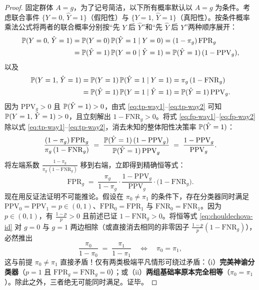 \begin{proof}
固定群体 $A = g$，为了记号简洁，以下所有概率默认以 $A = g$ 为条件。考虑联合事件 $\{Y = 0,\, \hat{Y} = 1\}$（假阳性）与 $\{Y = 1,\, \hat{Y} = 1\}$（真阳性）。按条件概率乘法公式将两者的联合概率分别按“先 $Y$ 后 $\hat{Y}$”和“先 $\hat{Y}$ 后 $Y$”两种顺序展开：
\begin{align}
  \mathbb{P}(Y = 0,\, \hat{Y} = 1)
  &= \mathbb{P}(Y = 0)\,\mathbb{P}(\hat{Y} = 1 \mid Y = 0) = (1 - \pi_g)\,\mathrm{FPR}_g \label{eq:fp-way1}\\
  &= \mathbb{P}(\hat{Y} = 1)\,\mathbb{P}(Y = 0 \mid \hat{Y} = 1) = \mathbb{P}(\hat{Y} = 1)\,(1 - \mathrm{PPV}_g), \label{eq:fp-way2}
\end{align}
以及
\begin{align}
  \mathbb{P}(Y = 1,\, \hat{Y} = 1)
  &= \mathbb{P}(Y = 1)\,\mathbb{P}(\hat{Y} = 1 \mid Y = 1) = \pi_g\,(1 - \mathrm{FNR}_g) \label{eq:tp-way1}\\
  &= \mathbb{P}(\hat{Y} = 1)\,\mathbb{P}(Y = 1 \mid \hat{Y} = 1) = \mathbb{P}(\hat{Y} = 1)\,\mathrm{PPV}_g. \label{eq:tp-way2}
\end{align}
因为 $\mathrm{PPV}_g > 0$ 且 $\mathbb{P}(\hat{Y} = 1) > 0$，由式 \eqref{eq:tp-way1}--\eqref{eq:tp-way2} 可知 $\mathbb{P}(Y = 1,\, \hat{Y} = 1) > 0$，且立刻解出 $1 - \mathrm{FNR}_g > 0$。将式 \eqref{eq:fp-way1}--\eqref{eq:fp-way2} 除以式 \eqref{eq:tp-way1}--\eqref{eq:tp-way2}，消去未知的整体阳性决策率 $\mathbb{P}(\hat{Y} = 1)$：
\[
  \frac{(1 - \pi_g)\,\mathrm{FPR}_g}{\pi_g\,(1 - \mathrm{FNR}_g)}
  \;=\; \frac{\mathbb{P}(\hat{Y} = 1)\,(1 - \mathrm{PPV}_g)}{\mathbb{P}(\hat{Y} = 1)\,\mathrm{PPV}_g}
  \;=\; \frac{1 - \mathrm{PPV}_g}{\mathrm{PPV}_g}.
\]
将左端系数 $\frac{1 - \pi_g}{\pi_g\,(1 - \mathrm{FNR}_g)}$ 移到右端，立即得到精确恒等式：
\[
  \mathrm{FPR}_g \;=\; \frac{\pi_g}{1 - \pi_g}\cdot \frac{1 - \mathrm{PPV}_g}{\mathrm{PPV}_g}\cdot \big(1 - \mathrm{FNR}_g\big).
\]
现在用反证法证明不可能推论。假设在 $\pi_0 \neq \pi_1$ 的条件下，存在分类器同时满足 $\mathrm{PPV}_0 = \mathrm{PPV}_1 = p \in (0, 1)$、$\mathrm{FPR}_0 = \mathrm{FPR}_1$ 与 $\mathrm{FNR}_0 = \mathrm{FNR}_1$。因为 $p \in (0, 1)$，有 $\frac{1 - p}{p} > 0$ 且前述已证 $1 - \mathrm{FNR}_g > 0$。将恒等式 \eqref{eq:chouldechova-id} 对 $g=0$ 与 $g=1$ 两边相除（或直接消去相同的非零因子 $\frac{1-p}{p}(1 - \mathrm{FNR}_g)$），必然推出
\[
  \frac{\pi_0}{1 - \pi_0} \;=\; \frac{\pi_1}{1 - \pi_1}
  \quad\Longleftrightarrow\quad
  \pi_0 = \pi_1,
\]
这与前提 $\pi_0 \neq \pi_1$ 直接矛盾！仅有两类极端平凡情形可绕过矛盾：（i）\textbf{完美神谕分类器}（$p = 1$ 且 $\mathrm{FPR}_g = \mathrm{FNR}_g = 0$）；或（ii）\textbf{两组基础率原本完全相等}（$\pi_0 = \pi_1$）。除此之外，三者绝无可能同时满足。证毕。
\end{proof}

